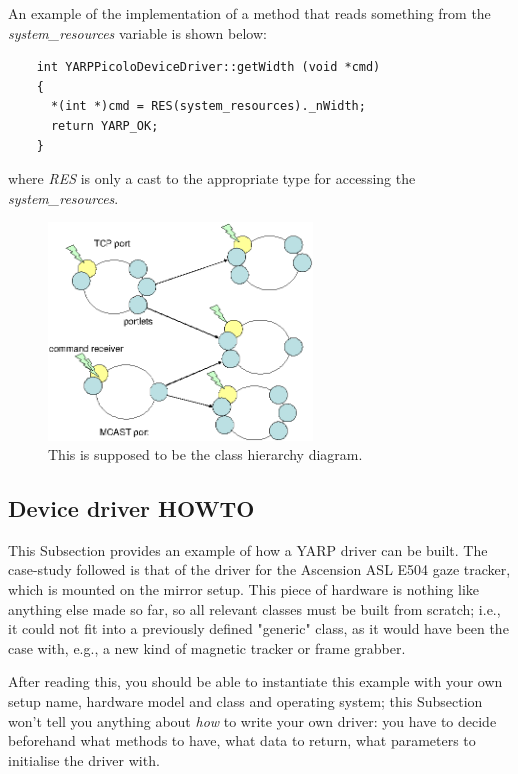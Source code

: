 An example of the implementation of a method that reads something from the {\em system\_resources} variable is shown below:

\begin{verbatim}
    int YARPPicoloDeviceDriver::getWidth (void *cmd)
    {
      *(int *)cmd = RES(system_resources)._nWidth;
      return YARP_OK;
    }
\end{verbatim}

\noindent where {\em RES} is only a cast to the appropriate type for accessing the {\em system\_resources}.

\begin{figure}[tb]
\centerline{
\includegraphics[width=7cm]{fig-port-portlets}
}
\caption[Interprocess communication model]{ 
%
This is supposed to be the class hierarchy diagram.
%
}
\label{fig:yarp-port}
\end{figure}

\subsection{Device driver HOWTO}

This Subsection provides an example of how a YARP driver can be
built. The case-study followed is that of the driver for the Ascension
ASL E504 gaze tracker, which is mounted on the mirror setup. This
piece of hardware is nothing like anything else made so far, so all
relevant classes must be built from scratch; i.e., it could not fit
into a previously defined "generic" class, as it would have been the
case with, e.g., a new kind of magnetic tracker or frame grabber.

After reading this, you should be able to instantiate this example with
your own setup name, hardware model and class and operating system;
this Subsection won't tell you anything about \emph{how} to write your
own driver: you have to decide beforehand what methods to have, what
data to return, what parameters to initialise the driver with.

